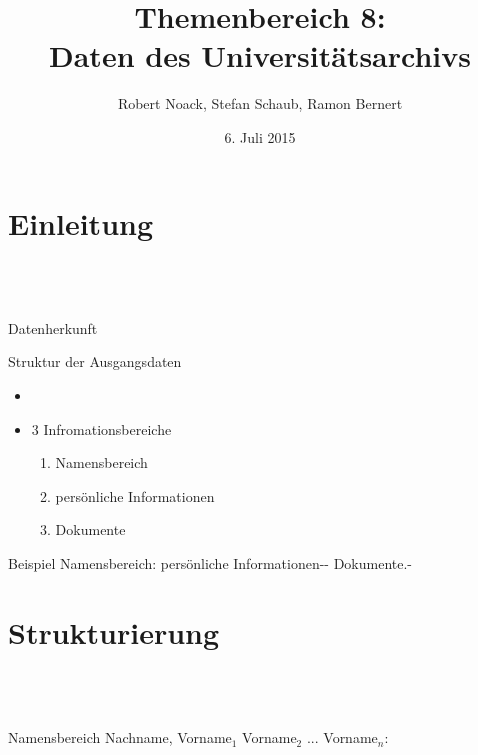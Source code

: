 \documentclass[12pt]{beamer}
\author{Robert Noack, Stefan Schaub, Ramon Bernert}
\title{\textbf{Themenbereich 8: \\Daten des Universitätsarchivs}}
\date{6. Juli 2015}
\begin{document}
\begin{large}
\section*{}
\begin{frame}
\titlepage
\end{frame}

\begin{frame}
\tableofcontents
\end{frame}

\section{Einleitung}
 \subsection*{~}
\begin{frame}{Datenherkunft}

\end{frame}

\begin{frame}{Struktur der Ausgangsdaten}
\begin{itemize}
\item 
\item 3 Infromationsbereiche
 \begin{enumerate}
  \item Namensbereich
  \item persönliche Informationen
  \item Dokumente
 \end{enumerate}
\end{itemize}

 
 \vspace*{\fill}
 \begin{block}{Beispiel}
 \normalsize Namensbereich: persönliche Informationen-{}- Dokumente.-
 \end{block}
\end{frame} 


\section{Strukturierung}
 \subsection*{~}
 
\begin{frame}{Namensbereich}
 Nachname, Vorname$_1$ Vorname$_2$ ... Vorname$_n$:


\end{frame}
\end{large}
\end{document}
